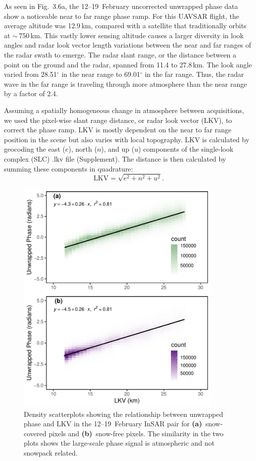As seen in Fig.~3.6a, the 12--19~February uncorrected unwrapped phase data show a noticeable near to far range phase ramp. For this UAVSAR flight, the average altitude was 12.9\,km, compared with a satellite that traditionally orbits at $\sim$\,750\,km. This vastly lower sensing altitude causes a larger diversity in look angles and radar look vector length variations between the near and far ranges of the radar swath to emerge. The radar slant range, or the distance between a point on the ground and the radar, spanned from 11.4 to 27.8\,km. The look angle varied from 28.51$^{\circ}$ in the near range to 69.01$^{\circ}$ in the far range. Thus, the radar wave in the far range is traveling through more atmosphere than the near range by a factor of 2.4.

Assuming a spatially homogeneous change in atmosphere between acquisitions, we used the pixel-wise slant range distance, or radar look vector (LKV), to correct the phase ramp. LKV is mostly dependent on the near to far range  position in the scene but also varies with local topography. LKV is calculated by geocoding the east ($e$), north ($n$), and up ($u$) components of the single-look complex (SLC) .lkv file (Supplement). The distance is then calculated by summing these components in quadrature:
\begin{equation}
\mathrm{LKV} = \sqrt{e^2 + n^2 + u^2}.
\end{equation}

\begin{figure}[t]
\centering
\includegraphics[width=10cm]{figures/ch3_figs/fig07.pdf}
\caption{Density scatterplots showing the relationship between unwrapped phase and LKV in the 12--19~February InSAR pair for \textbf{(a)}~snow-covered pixels and \textbf{(b)}~snow-free pixels. The similarity in the two plots shows the large-scale phase signal is atmospheric and not snowpack related.}
\end{figure}

